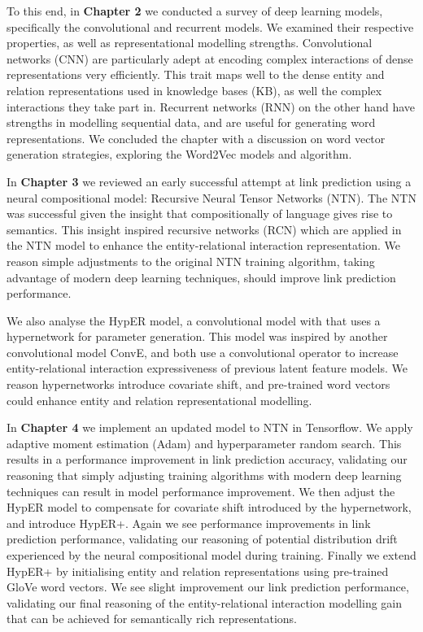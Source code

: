 \noindent To this end, in \textbf{Chapter 2} we conducted a survey of deep learning models, specifically the convolutional and recurrent models. We examined their respective properties, as well as representational modelling strengths. Convolutional networks (CNN) are particularly adept at encoding complex interactions of dense representations very efficiently. This trait maps well to the dense entity and relation representations used in knowledge bases (KB), as well the complex interactions they take part in. Recurrent networks (RNN) on the other hand have strengths in modelling sequential data, and are useful for generating word representations. We concluded the chapter with a discussion on word vector generation strategies, exploring the Word2Vec models and algorithm. \par

\noindent In \textbf{Chapter 3} we reviewed an early successful attempt at link prediction using a neural compositional model: Recursive Neural Tensor Networks (NTN). The NTN was successful given the insight that compositionally of language gives rise to semantics. This insight inspired recursive networks (RCN) which are applied in the NTN model to enhance the entity-relational interaction representation. We reason simple adjustments to the original NTN training algorithm, taking advantage of modern deep learning techniques, should improve link prediction performance. \par 

\noindent We also analyse the HypER model, a convolutional model with that uses a hypernetwork for parameter generation. This model was inspired by another convolutional model ConvE, and both use a convolutional operator to increase entity-relational interaction expressiveness of previous latent feature models. We reason hypernetworks introduce covariate shift, and pre-trained word vectors could enhance entity and relation representational modelling. \par

\noindent In \textbf{Chapter 4} we implement an updated model to NTN in Tensorflow. We apply adaptive moment estimation (Adam) and hyperparameter random search. This results in a performance improvement in link prediction accuracy, validating our reasoning that simply adjusting training algorithms with modern deep learning techniques can result in model performance improvement. We then adjust the HypER model to compensate for covariate shift introduced by the hypernetwork, and introduce HypER+. Again we see performance improvements in link prediction performance, validating our reasoning of potential distribution drift experienced by the neural compositional model during training. Finally we extend HypER+ by initialising entity and relation representations using pre-trained GloVe word vectors. We see slight improvement our link prediction performance, validating our final reasoning of the entity-relational interaction modelling gain that can be achieved for semantically rich representations. \par

